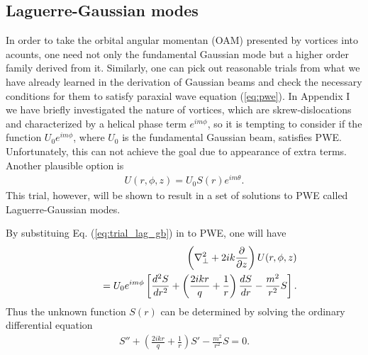 \subsection{Laguerre-Gaussian modes}
In order to take the orbital angular momentan (OAM) presented by vortices into acounts, one need not only the fundamental Gaussian mode but a higher order family derived from it. Similarly, one can pick out reasonable trials from what we have already learned in the derivation of Gaussian beams and check the necessary conditions for them to satisfy paraxial wave equation (\ref{eq:pwe}). In Appendix I we have briefly investigated the nature of vortices, which are skrew-dislocations and characterized by a helical phase term $e^{i m \phi}$, so it is tempting to consider if the function $U_0 e^{im \phi}$, where $U_0$ is the fundamental Gaussian beam, satisfies PWE. Unfortunately, this can not achieve the goal due to appearance of extra terms. Another plausible option is
\begin{eqnarray}
	U(r, \phi, z) = U_0 S(r) e^{i m \theta}.
	\label{eq:trial_lag_gb}
\end{eqnarray}
This trial, however, will be shown to result in a set of solutions to PWE called Laguerre-Gaussian modes.

By substituing Eq. (\ref{eq:trial_lag_gb}) in to PWE, one will have
\begin{eqnarray}
	&&\left(\nabla_{\perp}^2 + 2 i k \frac{\partial}{\partial z}\right) U(r, \phi, z)
	\nonumber\\
	&& \hspace{0.3in} = U_0 e^{i m \phi} \left[ \frac{d^2 S}{d r^2} + 
		\left( \frac{2 i k r}{q} + \frac{1}{r} \right) \frac{d S}{d r} 
			- \frac{m^2}{r^2} S \right].
	\nonumber
\end{eqnarray}
Thus the unknown function $S(r)$ can be determined by solving the ordinary differential equation
\begin{eqnarray}
	S'' + \left( \frac{2 i k r}{q} + \frac{1}{r} \right) S' - \frac{m^2}{r^2} S = 0.
\end{eqnarray}

